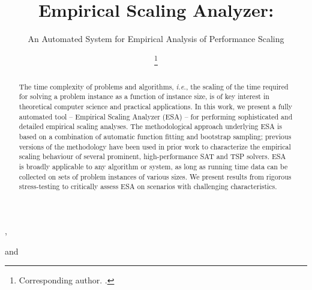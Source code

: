 \documentclass[aic]{iosart2x}
\newcommand{\ie}{\emph{i.e.}}
\begin{document}
\begin{frontmatter}

\title{Empirical Scaling Analyzer:}
\subtitle{An Automated System for Empirical Analysis of Performance Scaling}


\author[A]{ },
\author[A]{ }
and
\author[B,A]{ %
\thanks{Corresponding author. .}}
\address[A]{Department of Computer Science, ,
BC, }
\address[B]{LIACS, , }

\begin{abstract}
The time complexity of problems and algorithms, \ie, the scaling of the time required for solving a problem instance as a function of instance size, is of key interest in theoretical computer science and practical applications. In this work, we present a fully automated tool -- Empirical Scaling Analyzer (ESA) -- for performing sophisticated and detailed empirical scaling analyses. The methodological approach underlying ESA is based on a combination of automatic function fitting and bootstrap sampling; previous versions of the methodology have been used in prior work to characterize the empirical scaling behaviour of several prominent, high-performance SAT and TSP solvers. ESA is broadly applicable to any algorithm or system, as long as running time data can be collected on sets of problem instances of various sizes. We present results from rigorous stress-testing to critically assess ESA on scenarios with challenging characteristics. %
\end{abstract}

\begin{keyword}
\end{keyword}

\end{frontmatter}
\end{document}
